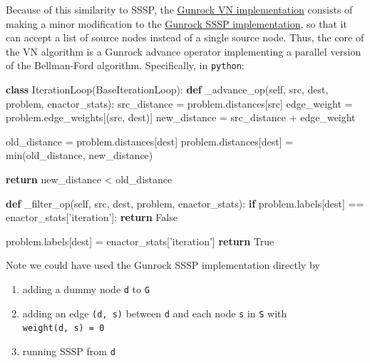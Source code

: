 \documentclass[10pt,oneside]{memoir}
\newenvironment{Shaded}{}{}
\newcommand{\BuiltInTok}[1]{#1}
\newcommand{\ControlFlowTok}[1]{\textcolor[rgb]{0.00,0.44,0.13}{\textbf{#1}}}
\newcommand{\KeywordTok}[1]{\textcolor[rgb]{0.00,0.44,0.13}{\textbf{#1}}}
\newcommand{\NormalTok}[1]{#1}
\newcommand{\OperatorTok}[1]{\textcolor[rgb]{0.40,0.40,0.40}{#1}}
\newcommand{\StringTok}[1]{\textcolor[rgb]{0.25,0.44,0.63}{#1}}
\newcommand{\VariableTok}[1]{\textcolor[rgb]{0.10,0.09,0.49}{#1}}
\providecommand{\tightlist}{%
  \setlength{\itemsep}{0pt}\setlength{\parskip}{0pt}}
\begin{document}
Because of this similarity to SSSP, the
\href{https://github.com/gunrock/gunrock/tree/dev-refactor/tests/vn}{Gunrock
VN implementation} consists of making a minor modification to the
\href{https://github.com/gunrock/gunrock/tree/dev-refactor/tests/sssp}{Gunrock
SSSP implementation}, so that it can accept a list of source nodes
instead of a single source node. Thus, the core of the VN algorithm is a
Gunrock advance operator implementing a parallel version of the
Bellman-Ford algorithm. Specifically, in \texttt{python}:

\begin{Shaded}
\begin{Highlighting}[]
\KeywordTok{class}\NormalTok{ IterationLoop(BaseIterationLoop):}
    \KeywordTok{def}\NormalTok{ _advance_op(}\VariableTok{self}\NormalTok{, src, dest, problem, enactor_stats):}
\NormalTok{        src_distance }\OperatorTok{=}\NormalTok{ problem.distances[src]}
\NormalTok{        edge_weight  }\OperatorTok{=}\NormalTok{ problem.edge_weights[(src, dest)]}
\NormalTok{        new_distance }\OperatorTok{=}\NormalTok{ src_distance }\OperatorTok{+}\NormalTok{ edge_weight}

\NormalTok{        old_distance }\OperatorTok{=}\NormalTok{ problem.distances[dest]}
\NormalTok{        problem.distances[dest] }\OperatorTok{=} \BuiltInTok{min}\NormalTok{(old_distance, new_distance)}

        \ControlFlowTok{return}\NormalTok{ new_distance }\OperatorTok{<}\NormalTok{ old_distance}

    \KeywordTok{def}\NormalTok{ _filter_op(}\VariableTok{self}\NormalTok{, src, dest, problem, enactor_stats):}
        \ControlFlowTok{if}\NormalTok{ problem.labels[dest] }\OperatorTok{==}\NormalTok{ enactor_stats[}\StringTok{'iteration'}\NormalTok{]:}
            \ControlFlowTok{return} \VariableTok{False}

\NormalTok{        problem.labels[dest] }\OperatorTok{=}\NormalTok{ enactor_stats[}\StringTok{'iteration'}\NormalTok{]}
        \ControlFlowTok{return} \VariableTok{True}
\end{Highlighting}
\end{Shaded}

Note we could have used the Gunrock SSSP implementation directly by

\begin{enumerate}
\def\labelenumi{\arabic{enumi}.}
\tightlist
\item
  adding a dummy node \texttt{d} to \texttt{G}
\item
  adding an edge \texttt{(d,\ s)} between \texttt{d} and each node
  \texttt{s} in \texttt{S} with \texttt{weight(d,\ s)\ =\ 0}
\item
  running SSSP from \texttt{d}
\end{enumerate}
\end{document}
